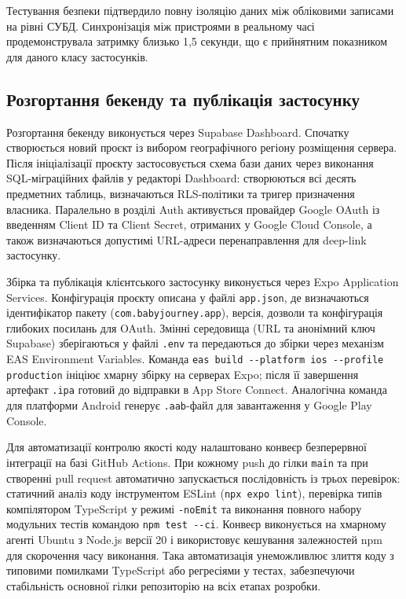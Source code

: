 Тестування безпеки підтвердило повну ізоляцію даних між обліковими записами на рівні \gls{СУБД}. Синхронізація між пристроями в реальному часі продемонструвала затримку близько 1,5 секунди, що є прийнятним показником для даного класу застосунків.

\subsection{Розгортання бекенду та публікація застосунку}

Розгортання бекенду виконується через Supabase Dashboard. Спочатку створюється новий проєкт із вибором географічного регіону розміщення сервера. Після ініціалізації проєкту застосовується схема бази даних через виконання SQL-міграційних файлів у редакторі Dashboard: створюються всі десять предметних таблиць, визначаються \gls{RLS}-політики та тригер призначення власника. Паралельно в розділі Auth активується провайдер Google OAuth із введенням Client ID та Client Secret, отриманих у Google Cloud Console, а також визначаються допустимі URL-адреси перенаправлення для deep-link застосунку.

Збірка та публікація клієнтського застосунку виконується через Expo Application Services. Конфігурація проєкту описана у файлі \texttt{app.json}, де визначаються ідентифікатор пакету (\texttt{com.babyjourney.app}), версія, дозволи та конфігурація глибоких посилань для \gls{OAuth}. Змінні середовища (URL та анонімний ключ Supabase) зберігаються у файлі \texttt{.env} та передаються до збірки через механізм EAS Environment Variables. Команда \texttt{eas build -{}-platform ios -{}-profile production} ініціює хмарну збірку на серверах Expo; після її завершення артефакт \texttt{.ipa} готовий до відправки в App Store Connect. Аналогічна команда для платформи Android генерує \texttt{.aab}-файл для завантаження у Google Play Console.

Для автоматизації контролю якості коду налаштовано конвеєр безперервної інтеграції на базі GitHub Actions. При кожному push до гілки \texttt{main} та при створенні pull request автоматично запускається послідовність із трьох перевірок: статичний аналіз коду інструментом ESLint (\texttt{npx expo lint}), перевірка типів компілятором TypeScript у режимі \texttt{-noEmit} та виконання повного набору модульних тестів командою \texttt{npm test -{}-ci}. Конвеєр виконується на хмарному агенті Ubuntu з Node.js версії 20 і використовує кешування залежностей npm для скорочення часу виконання. Така автоматизація унеможливлює злиття коду з типовими помилками TypeScript або регресіями у тестах, забезпечуючи стабільність основної гілки репозиторію на всіх етапах розробки.

